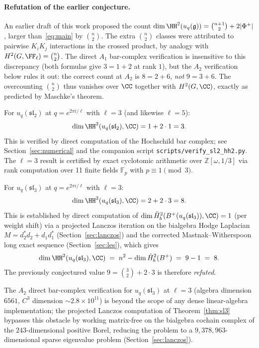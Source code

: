 \paragraph{Refutation of the earlier conjecture.}
An earlier draft of this work proposed the count $\dim \HH^2(u_q(\mathfrak{g})) = \binom{n+1}{2} + 2|\Phi^+|$, larger than~\eqref{eq:main} by $\binom{n}{2}$. The extra $\binom{n}{2}$ classes were attributed to pairwise $K_i K_j$ interactions in the crossed product, by analogy with $H^2(G, \FF_\ell) = \binom{n}{2}$. The direct $A_1$ bar-complex verification is insensitive to this discrepancy (both formulas give $3 = 1 + 2$ at rank $1$), but the $A_2$ verification below rules it out: the correct count at $A_2$ is $8 = 2 + 6$, \emph{not} $9 = 3 + 6$. The overcounting $\binom{n}{2}$ thus vanishes over $\CC$ together with $H^2(G, \CC)$, exactly as predicted by Maschke's theorem.

\begin{theorem}[$A_1$ verification]
\label{thm:sl2}
For $u_q(\mathfrak{sl}_2)$ at $q = e^{2\pi i/\ell}$ with $\ell = 3$ (and likewise $\ell = 5$):
\[
\dim \HH^2(u_q(\mathfrak{sl}_2), \CC) = 1 + 2 \cdot 1 = 3.
\]
This is verified by direct computation of the Hochschild bar complex; see Section~\ref{sec:numerical} and the companion script \texttt{scripts/verify\_sl2\_hh2.py}. The $\ell = 3$ result is certified by exact cyclotomic arithmetic over $\mathbb{Z}[\omega, 1/3]$ via rank computation over 11 finite fields $\mathbb{F}_p$ with $p \equiv 1 \pmod{3}$.
\end{theorem}

\begin{theorem}
\label{thm:sl3}
For $u_q(\mathfrak{sl}_3)$ at $q = e^{2\pi i/\ell}$ with $\ell = 3$:
\[
\dim \HH^2(u_q(\mathfrak{sl}_3), \CC) = 2 + 2 \cdot 3 = 8.
\]
This is established by direct computation of $\dim \tilde{H}^2_b(B^+(u_q(\mathfrak{sl}_3)), \CC) = 1$ (per weight shift) via a projected Lanczos iteration on the bialgebra Hodge Laplacian $M = d_2^* d_2 + d_1 d_1^*$ (Section~\ref{sec:lanczos}) and the corrected Mastnak--Witherspoon long exact sequence (Section~\ref{sec:les}), which gives
\[
\dim \HH^2(u_q(\mathfrak{sl}_3), \CC) \;=\; n^2 - \dim \tilde{H}^2_b(B^+) \;=\; 9 - 1 \;=\; 8.
\]
The previously conjectured value $9 = \binom{3}{2} + 2 \cdot 3$ is therefore \emph{refuted}.
\end{theorem}

The $A_2$ direct bar-complex verification for $u_q(\mathfrak{sl}_3)$ at $\ell = 3$ (algebra dimension $6561$, $C^3$ dimension $\sim 2.8 \times 10^{11}$) is beyond the scope of any dense linear-algebra implementation; the projected Lanczos computation of Theorem~\ref{thm:sl3} bypasses this obstacle by working matrix-free on the bialgebra cochain complex of the $243$-dimensional positive Borel, reducing the problem to a $9{,}378{,}963$-dimensional sparse eigenvalue problem (Section~\ref{sec:lanczos}).

